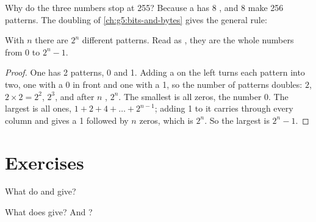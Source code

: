 Why do the three numbers stop at 255? Because a  has 8 , and 8 
make 256 patterns. The doubling of \cref{ch:g5:bits-and-bytes} gives the
general rule:

\begin{proposition}\label{prop:g8:binary-and-hexadecimal:patterns}
With $n$  there are $2^n$ different patterns. Read as ,
they are the whole numbers from 0 to $2^n - 1$.
\end{proposition}

\begin{proof}
One  has 2 patterns, 0 and 1. Adding a  on the left turns each pattern
into two, one with a 0 in front and one with a 1, so the number of patterns
doubles: $2$, $2 \times 2 = 2^2$, $2^3$, and after $n$ , $2^n$. The
smallest is all zeros, the number 0. The largest is all ones,
$1 + 2 + 4 + \dots + 2^{n-1}$; adding 1 to it carries through every column
and gives a 1 followed by $n$ zeros, which is $2^n$. So the largest is
$2^n - 1$.
\end{proof}

\label{lst:g8:binary-and-hexadecimal:patterns}

\label{out:g8:binary-and-hexadecimal:patterns}

\section{Exercises}

\begin{exercise}[$\star$]\label{exo:g8:binary-and-hexadecimal:1}
What do  and  give?
\end{exercise}

\begin{exercise}[$\star$]\label{exo:g8:binary-and-hexadecimal:2}
What does  give? And ?
\end{exercise}

